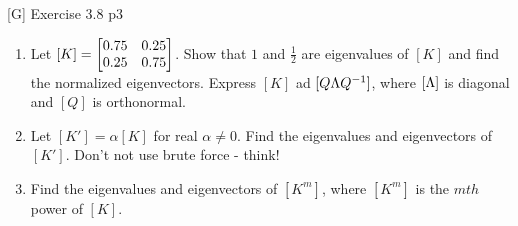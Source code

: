\documentclass[a4paper, 11pt]{article}
\begin{document}

\begin{problem}{%
        [G] Exercise 3.8
    }{p3%
    }
    \begin{enumerate}[label=(\alph*)]
        \item Let $[K]=\left[\begin{matrix}0.75 & 0.25\\ 0.25 & 0.75\end{matrix}\right]$. Show that $1$ and $\frac12$ are eigenvalues of $[K]$ and find the normalized eigenvectors. Express $[K]$ ad $[Q\Lambda Q^{-1}]$, where $[\Lambda]$ is diagonal and $[Q]$ is orthonormal.
        \item Let $[K']=\alpha[K]$ for real $\alpha\neq 0$. Find the eigenvalues and eigenvectors of $[K']$. Don't not use brute force - think!
        \item Find the eigenvalues and eigenvectors of $[K^m]$, where $[K^m]$ is the $mth$ power of $[K]$.
    \end{enumerate}
\end{problem}
\end{document}
